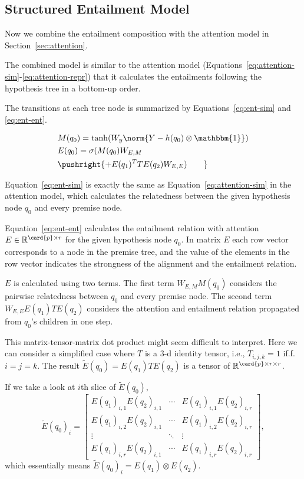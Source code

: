 \subsection{Structured Entailment Model}

Now we combine the entailment composition with the attention model
in Section~\ref{sec:attention}.

The combined model is similar to the attention model 
(Equations~\ref{eq:attention-sim}-\ref{eq:attention-repr})
that it calculates the entailments following the
hypothesis tree in a bottom-up order.

The transitions at each tree node is summarized by Equations~\ref{eq:ent-sim} and \ref{eq:ent-ent}.

\begin{align}
& M(q_0) = \tanh(W_y \norm{Y - h(q_0)\otimes \mathbbm{1}})\label{eq:ent-sim}\\
& E(q_0) = \sigma(M(q_0)W_{E,M} \notag\\
& \pushright{+E(q_1)^TTE(q_2)W_{E,E})\qquad}\label{eq:ent-ent}
\end{align}

Equation~\ref{eq:ent-sim} is exactly the same as 
Equation~\ref{eq:attention-sim} in the attention model,
which calculates the relatedness between 
the given hypothesis node $q_0$ and every premise node.

Equation~\ref{eq:ent-ent} calculates the entailment
relation with attention $E\in\mathbb{R}^{\card{p}\times r}$ 
for the given hypothesis node $q_0$.
In matrix $E$ each row vector corresponds to a node in the premise tree,
and the value of the elements in the row vector indicates 
the strongness of the alignment and the entailment relation.

$E$ is calculated using two terms. The first term $W_{E,M}M(q_0)$
considers the pairwise relatedness between $q_0$ and every premise node.
The second term $W_{E,E}E(q_1)TE(q_2)$ considers the 
attention and entailment relation propagated from $q_0$'s children
in one step.

This matrix-tensor-matrix dot product might seem difficult to interpret.
Here we can consider a simplified case where $T$ is a 3-d 
identity tensor, i.e., $T_{i,j,k}=1$ if.f. $i=j=k$.
The result $\tilde{E}(q_0) = E(q_1)TE(q_2)$ is a tensor of 
$\mathbb{R}^{\card{p}\times r\times r}$.

If we take a look at $i$th slice of $\tilde{E}(q_0)$, 
\[
\tilde{E}(q_0)_i =
\begin{bmatrix}
E(q_1)_{i,1}E(q_2)_{i,1} & \cdots & E(q_1)_{i,1}E(q_2)_{i,r}\\
E(q_1)_{i,2}E(q_2)_{i,1} & \cdots & E(q_1)_{i,2}E(q_2)_{i,r}\\
\vdots & \ddots & \vdots \\
E(q_1)_{i,r}E(q_2)_{i,1} & \cdots & E(q_1)_{i,r}E(q_2)_{i,r}
\end{bmatrix},
\]
which essentially means
$\tilde{E}(q_0)_i = E(q_1)\otimes E(q_2)$.

